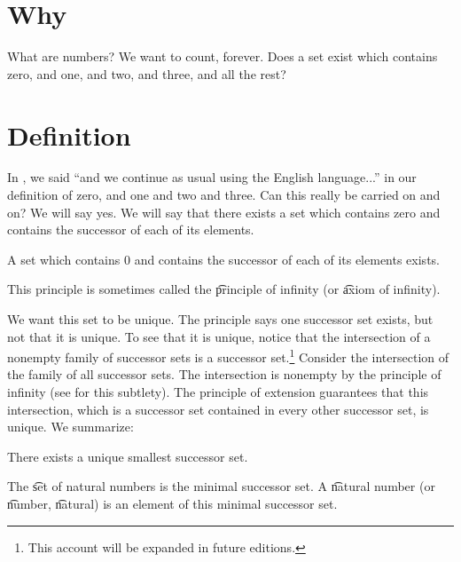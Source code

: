 
% 

\section*{Why}

What are numbers?
We want to count, forever.
Does a set exist which contains zero, and one, and two, and three, and all the rest?

\section*{Definition}

In , we said ``and we continue as usual using the English language...'' in our definition of zero, and one and two and three.
Can this really be carried on and on?
We will say yes.
We will say that there exists a set which contains zero and contains the successor of each of its elements.

\begin{principle}
A set which contains 0 and contains the successor of each of its elements exists.
\end{principle}

This principle is sometimes called the \t{principle of infinity} (or \t{axiom of infinity}).

We want this set to be unique.
The principle says one successor set exists, but not that it is unique.
To see that it is unique, notice that the intersection of a nonempty family of successor sets is a successor set.\footnote{This account will be expanded in future editions.}
Consider the intersection of the family of all successor sets.
The intersection is nonempty by the principle of infinity (see for this subtlety).
The principle of extension guarantees that this intersection, which is a successor set contained in every other successor set, is unique.
We summarize:

\begin{proposition}

\label{natural_numbers:proposition:omega}There exists a unique smallest successor set.
\end{proposition}

The \t{set of natural numbers} is the minimal successor set.
A \t{natural number} (or \t{number}, \t{natural}) is an element of this minimal successor set.

